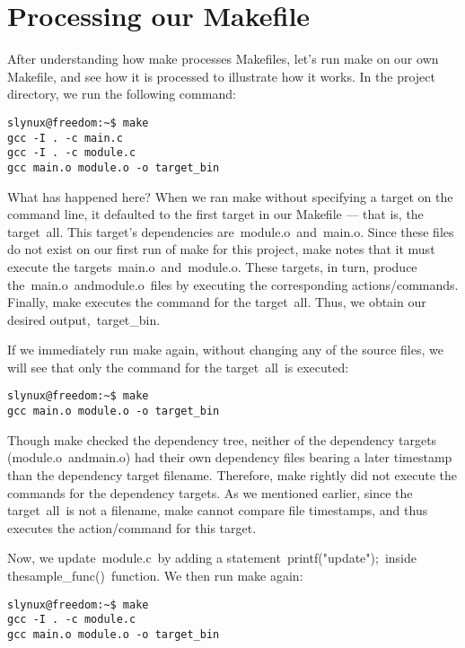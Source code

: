 \documentclass[12pt]{article}
\begin{document}
\section *{Processing our Makefile}

After understanding how make processes Makefiles, let’s run make on our own Makefile, and see how it is processed to illustrate how it works. In the project directory, we run the following command:

\begin{verbatim}
slynux@freedom:~$ make
gcc -I . -c main.c
gcc -I . -c module.c
gcc main.o module.o -o target_bin
\end{verbatim}

What has happened here?
When we ran make without specifying a target on the command line, it defaulted to the first target in our Makefile — that is, the target all. This target’s dependencies are module.o and main.o. Since these files do not exist on our first run of make for this project, make notes that it must execute the targets main.o and module.o. These targets, in turn, produce the main.o andmodule.o files by executing the corresponding actions/commands. Finally, make executes the command for the target all. Thus, we obtain our desired output, target\_bin.

If we immediately run make again, without changing any of the source files, we will see that only the command for the target all is executed:

\begin{verbatim}
slynux@freedom:~$ make
gcc main.o module.o -o target_bin
\end{verbatim}

Though make checked the dependency tree, neither of the dependency targets (module.o andmain.o) had their own dependency files bearing a later timestamp than the dependency target filename. Therefore, make rightly did not execute the commands for the dependency targets. As we mentioned earlier, since the target all is not a filename, make cannot compare file timestamps, and thus executes the action/command for this target.

Now, we update module.c by adding a statement printf("\nfirst update"); inside thesample\_func() function. We then run make again:

\begin{verbatim}
slynux@freedom:~$ make
gcc -I . -c module.c
gcc main.o module.o -o target_bin
\end{verbatim}
\end{document}
